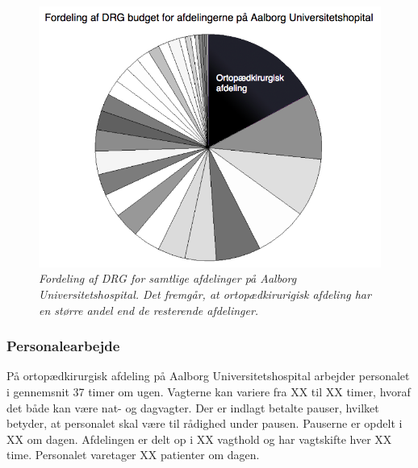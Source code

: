\begin{figure}[H]
	\flushleft 
	\centering
	\includegraphics[scale=0.45]{figures/Ortopaeddiagram.png}
	\flushleft
	\caption{\textit{Fordeling af DRG for samtlige afdelinger på Aalborg Universitetshospital. Det fremgår, at ortopædkirurigisk afdeling har en større andel end de resterende afdelinger.}\cite{Rasmussen2016}}
	\label{DRG_budget}
\end{figure}



\subsubsection{Personalearbejde} 
På ortopædkirurgisk afdeling på Aalborg Universitetshospital arbejder personalet i gennemsnit 37 timer om ugen\cite{Danske2015}. Vagterne kan variere fra XX til XX timer, hvoraf det både kan være nat- og dagvagter. Der er indlagt betalte pauser, hvilket betyder, at personalet skal være til rådighed under pausen. Pauserne er opdelt i XX om dagen. Afdelingen er delt op i XX vagthold og har vagtskifte hver XX time. Personalet varetager XX patienter om dagen. 

